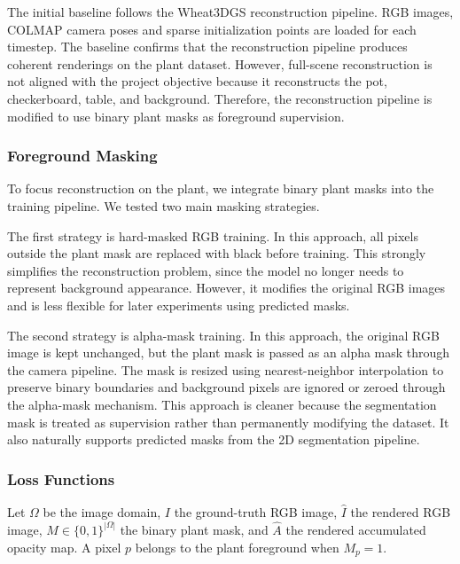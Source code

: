 \documentclass[sigconf]{acmart}
\begin{document}
The initial baseline follows the Wheat3DGS\cite{wheat3dgs} reconstruction pipeline. RGB images, COLMAP camera poses and sparse initialization points are loaded for each timestep. The baseline confirms that the reconstruction pipeline produces coherent renderings on the plant dataset. However, full-scene reconstruction is not aligned with the project objective because it reconstructs the pot, checkerboard, table, and background. Therefore, the reconstruction pipeline is modified to use binary plant masks as foreground supervision.


\subsubsection{Foreground Masking}
To focus reconstruction on the plant, we integrate binary plant masks into the training pipeline. We tested two main masking strategies.

The first strategy is hard-masked RGB training. In this approach, all pixels outside the plant mask are replaced with black before training. This strongly simplifies the reconstruction problem, since the model no longer needs to represent background appearance. However, it modifies the original RGB images and is less flexible for later experiments using predicted masks.

The second strategy is alpha-mask training. In this approach, the original RGB image is kept unchanged, but the plant mask is passed as an alpha mask through the camera pipeline. The mask is resized using nearest-neighbor interpolation to preserve binary boundaries and background pixels are ignored or zeroed through the alpha-mask mechanism. This approach is cleaner because the segmentation mask is treated as supervision rather than permanently modifying the dataset. It also naturally supports predicted masks from the 2D segmentation pipeline.


\subsubsection{Loss Functions}

Let $\Omega$ be the image domain, $I$ the ground-truth RGB image, $\hat{I}$ the rendered RGB image, $M \in \{0,1\}^{|\Omega|}$ the binary plant mask, and $\hat{A}$ the rendered accumulated opacity map. A pixel $p$ belongs to the plant foreground when $M_p=1$.
\end{document}
